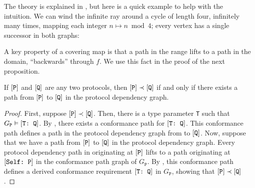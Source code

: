 \documentclass[../generics]{subfiles}
\begin{document}
The theory is explained in \cite{godsil2001algebraic}, but here is a quick example to help with the intuition. We can wind the infinite ray around a cycle of length four, infinitely many times, mapping each integer $n\mapsto n \bmod 4$; every vertex has a single successor in both graphs:
\begin{center}
\end{center}
A key property of a covering map is that a path in the range lifts to a path in the domain, ``backwards'' through $f$. We use this fact in the proof of the next proposition.

\begin{proposition}
If $[\texttt{P}]$ and $[\texttt{Q}]$ are any two protocols, then $[\texttt{P}]\prec[\texttt{Q}]$ if and only if there exists a path from $[\texttt{P}]$ to $[\texttt{Q}]$ in the protocol dependency graph.
\end{proposition}
\begin{proof}
First, suppose $[\texttt{P}]\prec[\texttt{Q}]$. Then, there is a type parameter \texttt{T} such that $G_\texttt{P}\vDash[\texttt{T:~Q}]$. By , there exists a conformance path for $[\texttt{T:~Q}]$. This conformance path defines a path in the protocol dependency graph from  to $[\texttt{Q}]$. Now, suppose that we have a path from $[\texttt{P}]$ to $[\texttt{Q}]$ in the protocol dependency graph. Every protocol dependency path in originating at $[\texttt{P}]$ lifts to a path originating at $[\texttt{Self:~P}]$ in the conformance path graph of $G_\texttt{P}$. By , this conformance path defines a derived conformance requirement $[\texttt{T:~Q}]$ in $G_\texttt{P}$, showing that $[\texttt{P}]\prec[\texttt{Q}]$.
\end{proof}
\end{document}
